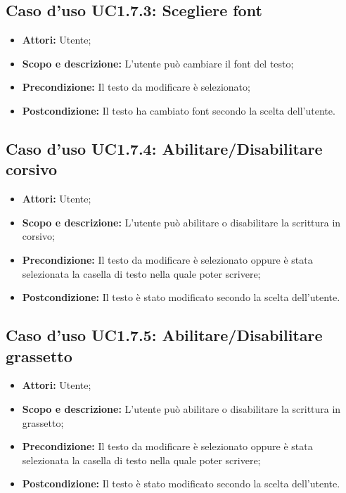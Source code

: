 \subsection{Caso d'uso UC1.7.3: Scegliere font}
\begin{itemize}
	\item \textbf{Attori:} Utente;
	\item \textbf{Scopo e descrizione:} L'utente può cambiare il font del testo;
	\item \textbf{Precondizione:} Il testo da modificare è selezionato;
	\item \textbf{Postcondizione:} Il testo ha cambiato font secondo la scelta dell'utente.
\end{itemize}

\subsection{Caso d'uso UC1.7.4: Abilitare/Disabilitare corsivo}
\begin{itemize}
	\item \textbf{Attori:} Utente;
	\item \textbf{Scopo e descrizione:} L'utente può abilitare o disabilitare la scrittura in corsivo;
	\item \textbf{Precondizione:} Il testo da modificare è selezionato oppure è stata selezionata la casella di testo nella quale poter scrivere;
	\item \textbf{Postcondizione:} Il testo è stato modificato secondo la scelta dell'utente.
\end{itemize}

\subsection{Caso d'uso UC1.7.5: Abilitare/Disabilitare grassetto}
\begin{itemize}
	\item \textbf{Attori:} Utente;
	\item \textbf{Scopo e descrizione:} L'utente può abilitare o disabilitare la scrittura in grassetto;
	\item \textbf{Precondizione:} Il testo da modificare è selezionato oppure è stata selezionata la casella di testo nella quale poter scrivere;
	\item \textbf{Postcondizione:} Il testo è stato modificato secondo la scelta dell'utente.
\end{itemize}

